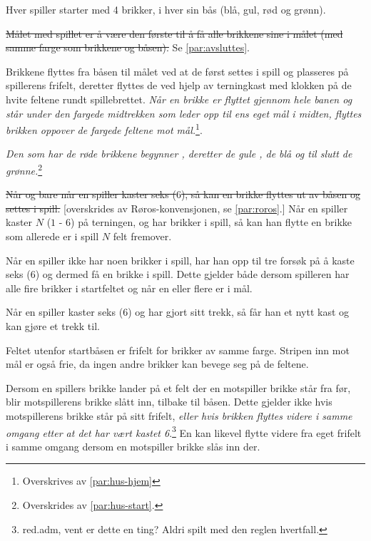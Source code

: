 \documentclass[10pt,a4paper,norsk,openany]{book}
\begin{document}
\begin{ludo}
   
  \item \label{sec:ludo} Hver spiller starter med 4 brikker, i hver sin bås (blå, gul, rød og
    grønn).
     
  \item \sout{Målet med spillet er å være den første til å få alle brikkene sine
    i målet (med samme farge som brikkene og båsen).} Se \cref{par:avsluttes}.

  \item Brikkene flyttes fra båsen til målet ved at de først settes i spill og
    plasseres på spillerens frifelt, deretter flyttes de ved hjelp av terningkast
    med klokken på de hvite feltene rundt spillebrettet. \emph{Når en brikke er
    flyttet gjennom hele banen og står under den fargede midtrekken som leder opp
    til ens eget mål i midten, flyttes brikken oppover de fargede feltene mot
    mål.}\footnote{Overskrives av \cref{par:hus-hjem}}. 
   
  \item \emph{Den som har de røde brikkene begynner , deretter de gule , de blå og til
    slutt de grønne.}\footnote{Overskrides av \cref{par:hus-start}.}
   
  \item \label{para:ludo:seks} \sout{Når og bare når en spiller kaster seks
    ($6$), så kan en brikke flyttes ut av båsen og settes i
    spill.} [overskrides av Røros-konvensjonen, se \cref{par:roros}.]
    Når en spiller kaster $N$ ($1$ - $6$) på terningen, og har brikker i
    spill, så kan han flytte en brikke som allerede er i spill $N$ felt fremover.
   
  \item Når en spiller ikke har noen brikker i spill, har han opp til tre forsøk
    på å kaste seks ($6$) og dermed få en brikke i spill. Dette gjelder både dersom
    spilleren har alle fire brikker i startfeltet og når en eller flere er i mål.
   
  \item Når en spiller kaster seks ($6$) og har gjort sitt trekk, så får han et
    nytt kast og kan gjøre et trekk til.
   
  \item Feltet utenfor startbåsen er frifelt for brikker av samme farge. Stripen
    inn mot mål er også frie, da ingen andre brikker kan bevege seg på de feltene.
   
  \item Dersom en spillers brikke lander på et felt der en motspiller brikke
    står fra før, blir motspillerens brikke slått inn, tilbake til båsen. Dette
    gjelder ikke hvis motspillerens brikke står på sitt frifelt, \emph{eller hvis
    brikken flyttes videre i samme omgang etter at det har vært kastet
    6}.\footnote{red.adm, vent er dette en ting? Aldri spilt med den reglen
    hvertfall.} En kan likevel flytte videre fra eget frifelt i samme omgang dersom
    en motspiller brikke slås inn der.
   

\end{ludo}
\end{document}
